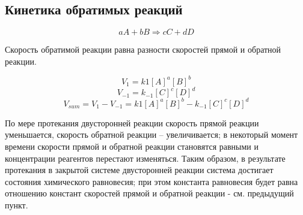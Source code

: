 \documentclass[14pt,a4paper]{scrartcl}
\begin{document}
\subsection*{Кинетика обратимых реакций}

$$aA + bB \Rightarrow cC + dD$$

Скорость обратимой реакции равна разности скоростей прямой и обратной реакции.

$$V_1 = k1 \left[A\right]^a\left[B\right]^b$$
$$V_{-1} = k_{-1}\left[C\right]^c\left[D\right]^d$$
$$V_{sum} = V_1 - V_{-1} = k1 \left[A\right]^a\left[B\right]^b - k_{-1}\left[C\right]^c\left[D\right]^d$$

По мере протекания двусторонней реакции скорость прямой реакции уменьшается, скорость обратной реакции – увеличивается; в некоторый момент времени скорости прямой и обратной реакции становятся равными и концентрации реагентов перестают изменяться. Таким образом, в результате протекания в закрытой системе двусторонней реакции система достигает состояния химического равновесия; при этом константа равновесия будет равна отношению констант скоростей прямой и обратной реакции - см. предыдущий пункт.
\end{document}

